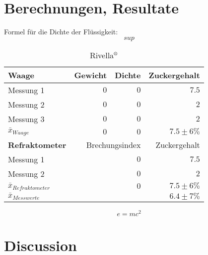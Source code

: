 \documentclass[a4paper]{article}
\begin{document}

\section{Berechnungen, Resultate}

Formel für die Dichte der Flüssigkeit:
\[sup\]

\begin{table}[H]
\caption{Rivella$\textsuperscript{\textregistered}$}
\centering
\begin{tabular}{lrrr}
\toprule
\bfseries Waage & Gewicht & Dichte & Zuckergehalt \\
\midrule
Messung 1 & $0$ & $0$ & $7.5$ \\
Messung 2 & $0$ & $0$ & $2$ \\
Messung 3 & $0$ & $0$ & $2$ \\
\midrule
$\bar{x}_{Waage}$ & $0$ & $0$ & $7.5 \pm 6\%$ \\
\toprule
\vspace{-1mm}
\bfseries Refraktometer & \multicolumn{2}{r}{Brechungsindex} & Zuckergehalt \\
\midrule
Messung 1 & & $0$ & $7.5$ \\
Messung 2 & & $0$ & $2$ \\
\midrule
$\bar{x}_{Refraktometer}$ & & $0$ & $7.5 \pm 6\%$ \\
\bottomrule
$\bar{x}_{Messwerte}$ & & & $6.4 \pm 7\%$ \\
\bottomrule
\end{tabular}
\end{table}

\lipsum[5] %

\begin{equation}
\label{eq:emc}
e = mc^2
\end{equation}

\lipsum[6] %


\section{Discussion}

\lipsum[7-8] %


\end{document}
